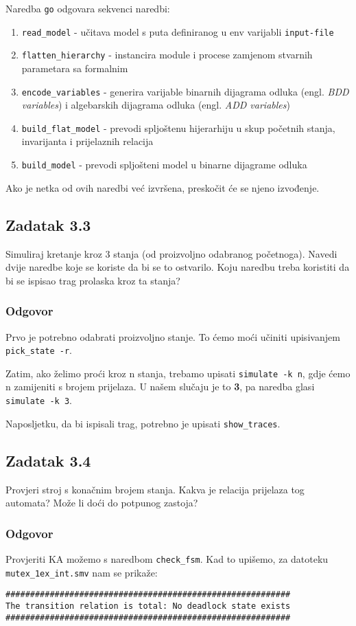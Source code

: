 \documentclass{article}
\newcommand{\zadatak}[1]{\subsection{Zadatak #1}}
\newcommand{\odgovor}{\subsubsection*{Odgovor}}
\newcommand{\code}[1]{\colorbox{blue!11}{\texttt{#1}}}
\begin{document}
Naredba \code{go} odgovara sekvenci naredbi:

\begin{enumerate}
    \item \code{read\_model} - učitava model s puta definiranog u env varijabli \code{input-file}
    \item \code{flatten\_hierarchy} - instancira module i procese zamjenom stvarnih parametara sa formalnim
    \item \code{encode\_variables} - generira varijable binarnih dijagrama odluka (engl. \textit{BDD variables}) i algebarskih dijagrama odluka (engl. \textit{ADD variables})
    \item \code{build\_flat\_model} - prevodi spljoštenu hijerarhiju u skup početnih stanja, invarijanta i prijelaznih relacija
    \item \code{build\_model} - prevodi spljošteni model u binarne dijagrame odluka
\end{enumerate}

\noindent
Ako je netka od ovih naredbi već izvršena, preskočit će se njeno izvođenje.
\pagebreak  %


\zadatak{3.3}

Simuliraj kretanje kroz 3 stanja (od proizvoljno odabranog početnoga). Navedi dvije naredbe koje se koriste da bi se to ostvarilo. Koju naredbu treba koristiti da bi se ispisao trag prolaska kroz ta stanja?

\odgovor

Prvo je potrebno odabrati proizvoljno stanje. To ćemo moći učiniti upisivanjem \code{pick\_state -r}.

Zatim, ako želimo proći kroz n stanja, trebamo upisati \code{simulate -k n}, gdje ćemo n zamijeniti s brojem prijelaza. U našem slučaju je to \textbf{3}, pa naredba glasi \code{simulate -k 3}.

Naposljetku, da bi ispisali trag, potrebno je upisati \code{show\_traces}.


\zadatak{3.4}

Provjeri stroj s konačnim brojem stanja. Kakva je relacija prijelaza tog automata? Može li doći do potpunog zastoja?

\odgovor

Provjeriti KA možemo s naredbom \code{check\_fsm}. Kad to upišemo, za datoteku \code{mutex\_1ex\_int.smv} nam se prikaže:

\begin{verbatim}
##########################################################
The transition relation is total: No deadlock state exists
##########################################################
\end{verbatim}
\end{document}
